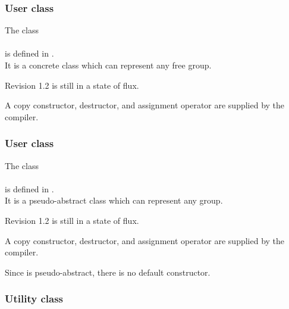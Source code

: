 \subsubsection{User class }


\noindent The class\\
\\
is defined in .\\
It is a concrete class which can represent any free group.



\noindent Revision 1.2 is still in a state of flux.

\noindent A copy constructor, destructor, and assignment operator are
supplied by the compiler.



\subsubsection{User class }


\noindent The class\\
\\
is defined in .\\
It is a pseudo-abstract class which can represent any group.



\noindent Revision 1.2 is still in a state of flux.

\noindent A copy constructor, destructor, and assignment operator are
supplied by the compiler.

\noindent Since  is pseudo-abstract, there is
no default constructor.



\subsubsection{Utility class }\label{presentationparser}

